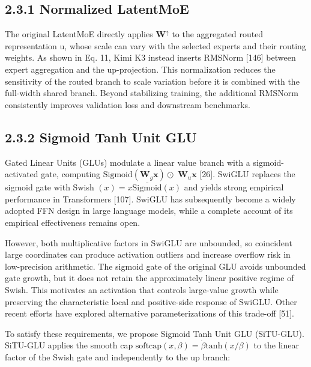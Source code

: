 \documentclass[
  10
]{article}
\begin{document}
\subsection{2.3.1 Normalized LatentMoE}\label{normalized-latentmoe}

The original LatentMoE directly applies \(\mathbf { W } ^ { \uparrow }\)
to the aggregated routed representation u, whose scale can vary with the
selected experts and their routing weights. As shown in Eq. 11, Kimi K3
instead inserts RMSNorm {[}146{]} between expert aggregation and the
up-projection. This normalization reduces the sensitivity of the routed
branch to scale variation before it is combined with the full-width
shared branch. Beyond stabilizing training, the additional RMSNorm
consistently improves validation loss and downstream benchmarks.

\subsection{2.3.2 Sigmoid Tanh Unit GLU}\label{sigmoid-tanh-unit-glu}

Gated Linear Units (GLUs) modulate a linear value branch with a
sigmoid-activated gate, computing
\(\mathrm { S i g m o i d } ( \mathbf { W } _ { g } \pmb { x } ) \odot\)
\({ \mathbf W } _ { u } \mathbf x\) {[}26{]}. SwiGLU replaces the
sigmoid gate with Swish
\(( x ) = x { \bar { \mathrm { S i g m o i d } } } ( x )\) and yields
strong empirical performance in Transformers {[}107{]}. SwiGLU has
subsequently become a widely adopted FFN design in large language
models, while a complete account of its empirical effectiveness remains
open.

However, both multiplicative factors in SwiGLU are unbounded, so
coincident large coordinates can produce activation outliers and
increase overflow risk in low-precision arithmetic. The sigmoid gate of
the original GLU avoids unbounded gate growth, but it does not retain
the approximately linear positive regime of Swish. This motivates an
activation that controls large-value growth while preserving the
characteristic local and positive-side response of SwiGLU. Other recent
efforts have explored alternative parameterizations of this trade-off
{[}51{]}.

To satisfy these requirements, we propose Sigmoid Tanh Unit GLU
(SiTU-GLU). SiTU-GLU applies the smooth cap
\(\mathrm { s o f t c a p } ( x , \beta ) = \dot { \beta } \mathrm { t a n h } ( x / \beta )\)
to the linear factor of the Swish gate and independently to the up
branch:
\end{document}
